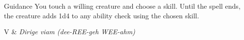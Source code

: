 \begin{Spell}[
  tags=Concentration,
  level=Cantrip,
  time=1 Action,
  range=Touch,
  components={V, S},
  duration=1 Minute,
  school=Divination,
  attack=None,
  effect=Buff
]{Guidance}
You touch a willing creature and choose a skill. Until the spell ends, the creature adds 1d4 to any ability check using the chosen skill.

\begin{components}
V & \textit{Dirige viam (dee-REE-geh WEE-ahm)}
\end{components}
\end{Spell}


